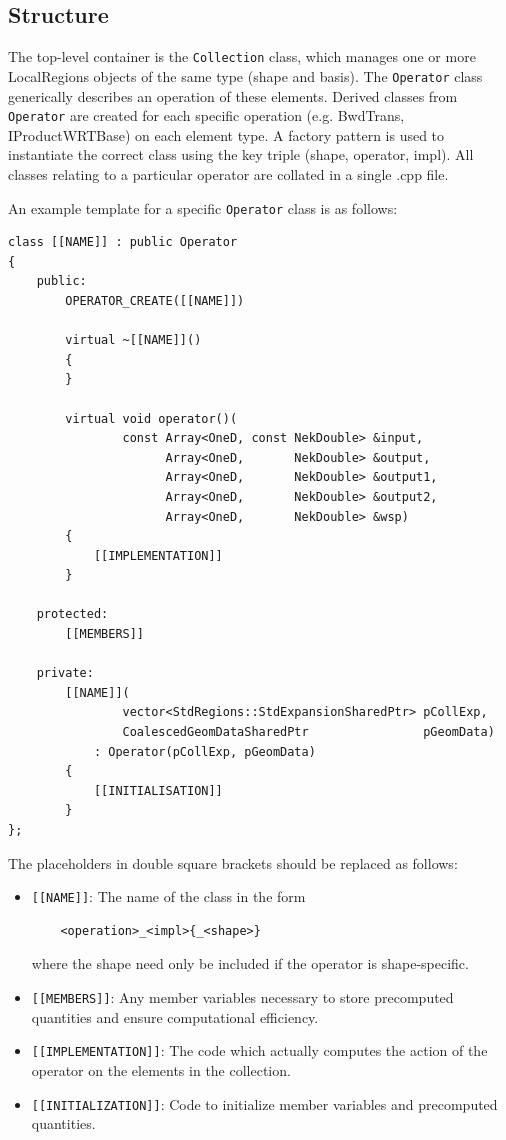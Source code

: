 \subsection{Structure}
The top-level container is the \texttt{Collection} class, which manages one or
more LocalRegions objects of the same type (shape and basis). The
\texttt{Operator} class generically describes an operation of these elements.
Derived classes from \texttt{Operator} are created for each specific operation
(e.g. BwdTrans, IProductWRTBase) on each element type. A factory pattern is used
to instantiate the correct class using the key triple (shape, operator, impl).
All classes relating to a particular operator are collated in a single .cpp
file.

An example template for a specific \texttt{Operator} class is as follows:
\begin{lstlisting}[style=C++Style]
class [[NAME]] : public Operator
{
    public:
        OPERATOR_CREATE([[NAME]])

        virtual ~[[NAME]]()
        {
        }

        virtual void operator()(
                const Array<OneD, const NekDouble> &input,
                      Array<OneD,       NekDouble> &output,
                      Array<OneD,       NekDouble> &output1,
                      Array<OneD,       NekDouble> &output2,
                      Array<OneD,       NekDouble> &wsp)
        {
            [[IMPLEMENTATION]]
        }

    protected:
        [[MEMBERS]]

    private:
        [[NAME]](
                vector<StdRegions::StdExpansionSharedPtr> pCollExp,
                CoalescedGeomDataSharedPtr                pGeomData)
            : Operator(pCollExp, pGeomData)
        {
            [[INITIALISATION]]
        }
};
\end{lstlisting}
The placeholders in double square brackets should be replaced as follows:
\begin{itemize}
	\item \texttt{[[NAME]]}: The name of the class in the form
	\begin{lstlisting}
	<operation>_<impl>{_<shape>}
	\end{lstlisting}
	where the shape need only be included if the operator is shape-specific.
	\item \texttt{[[MEMBERS]]}: Any member variables necessary to store precomputed
	quantities and ensure computational efficiency.
    \item \texttt{[[IMPLEMENTATION]]}: The code which actually computes the action
    of the operator on the elements in the collection.
	\item \texttt{[[INITIALIZATION]]}: Code to initialize member variables and
	precomputed quantities.
\end{itemize}

